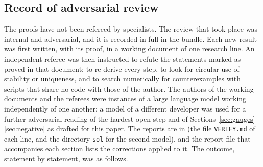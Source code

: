 \subsection{Record of adversarial review}\label{num:sec:review}
The proofs have not been refereed by specialists. The review that took place was internal and adversarial, and it is recorded in full in the bundle. Each new result was first written, with its proof, in a working document of one research line. An independent referee was then instructed to refute the statements marked as proved in that document: to re-derive every step, to look for circular use of stability or uniqueness, and to search numerically for counterexamples with scripts that share no code with those of the author. The authors of the working documents and the referees were instances of a large language model working independently of one another; a model of a different developer was used for a further adversarial reading of the hardest open step and of Sections~\ref{sec:gauges}--\ref{sec:negative} as drafted for this paper. The reports are in  (the file \texttt{VERIFY.md} of each line, and the directory \texttt{sol} for the second model), and the report file that accompanies each section lists the corrections applied to it. The outcome, statement by statement, was as follows.
